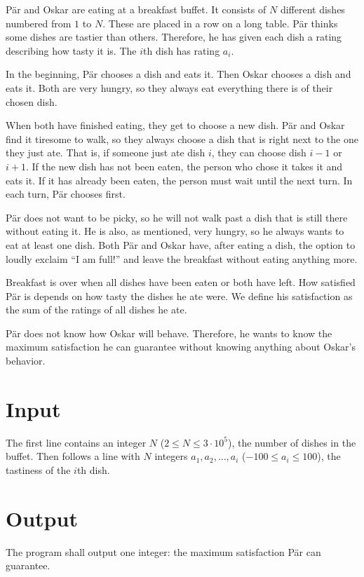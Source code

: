 Pär and Oskar are eating at a breakfast buffet.
It consists of $N$ different dishes numbered from $1$ to $N$.
These are placed in a row on a long table.
Pär thinks some dishes are tastier than others.
Therefore, he has given each dish a rating describing how tasty it is.
The $i$th dish has rating $a_i$.

In the beginning, Pär chooses a dish and eats it. Then Oskar chooses a dish and eats it.
Both are very hungry, so they always eat everything there is of their chosen dish.

When both have finished eating, they get to choose a new dish.
Pär and Oskar find it tiresome to walk, so they always choose a dish that is right next to the one they just ate.
That is, if someone just ate dish $i$, they can choose dish $i-1$ or $i+1$.
If the new dish has not been eaten, the person who chose it takes it and eats it.
If it has already been eaten, the person must wait until the next turn.
In each turn, Pär chooses first.

Pär does not want to be picky, so he will not walk past a dish that is still there without eating it.
He is also, as mentioned, very hungry, so he always wants to eat at least one dish.
Both Pär and Oskar have, after eating a dish, the option to loudly exclaim ``I am full!'' and leave the breakfast without eating anything more.

Breakfast is over when all dishes have been eaten or both have left.
How satisfied Pär is depends on how tasty the dishes he ate were.
We define his satisfaction as the sum of the ratings of all dishes he ate.

Pär does not know how Oskar will behave.
Therefore, he wants to know the maximum satisfaction he can guarantee without knowing anything about Oskar's behavior.

\section*{Input}
The first line contains an integer $N$ ($2 \leq N \leq 3 \cdot 10^5$), the number of dishes in the buffet.
Then follows a line with $N$ integers $a_1, a_2, \ldots, a_i$ ($-100 \leq a_i \leq 100$), the tastiness of the $i$th dish.

\section*{Output}
The program shall output one integer: the maximum satisfaction Pär can guarantee.

